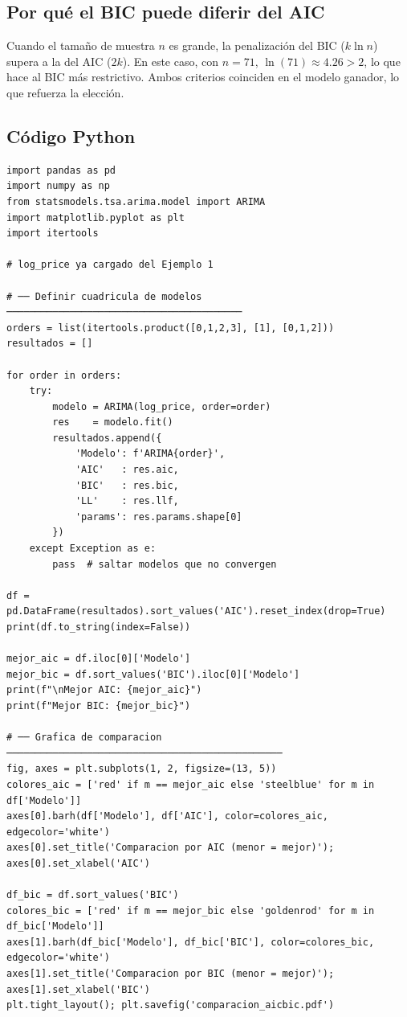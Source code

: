 \documentclass[12pt,a4paper]{article}
\begin{document}
\subsection{Por qu\'{e} el BIC puede diferir del AIC}

Cuando el tama\~no de muestra $n$ es grande, la penalizaci\'{o}n del BIC
($k\ln n$) supera a la del AIC ($2k$). En este caso, con $n=71$,
$\ln(71)\approx 4.26 > 2$, lo que hace al BIC m\'{a}s restrictivo. Ambos
criterios coinciden en el modelo ganador, lo que refuerza la elecci\'{o}n.

\subsection{C\'{o}digo Python}

\begin{lstlisting}[caption={Ejemplo 2 --- Comparaci\'{o}n de modelos con AIC y BIC},
                   label={lst:ej2}]
import pandas as pd
import numpy as np
from statsmodels.tsa.arima.model import ARIMA
import matplotlib.pyplot as plt
import itertools

# log_price ya cargado del Ejemplo 1

# ── Definir cuadricula de modelos ─────────────────────────────────────────
orders = list(itertools.product([0,1,2,3], [1], [0,1,2]))
resultados = []

for order in orders:
    try:
        modelo = ARIMA(log_price, order=order)
        res    = modelo.fit()
        resultados.append({
            'Modelo': f'ARIMA{order}',
            'AIC'   : res.aic,
            'BIC'   : res.bic,
            'LL'    : res.llf,
            'params': res.params.shape[0]
        })
    except Exception as e:
        pass  # saltar modelos que no convergen

df = pd.DataFrame(resultados).sort_values('AIC').reset_index(drop=True)
print(df.to_string(index=False))

mejor_aic = df.iloc[0]['Modelo']
mejor_bic = df.sort_values('BIC').iloc[0]['Modelo']
print(f"\nMejor AIC: {mejor_aic}")
print(f"Mejor BIC: {mejor_bic}")

# ── Grafica de comparacion ────────────────────────────────────────────────
fig, axes = plt.subplots(1, 2, figsize=(13, 5))
colores_aic = ['red' if m == mejor_aic else 'steelblue' for m in df['Modelo']]
axes[0].barh(df['Modelo'], df['AIC'], color=colores_aic, edgecolor='white')
axes[0].set_title('Comparacion por AIC (menor = mejor)'); axes[0].set_xlabel('AIC')

df_bic = df.sort_values('BIC')
colores_bic = ['red' if m == mejor_bic else 'goldenrod' for m in df_bic['Modelo']]
axes[1].barh(df_bic['Modelo'], df_bic['BIC'], color=colores_bic, edgecolor='white')
axes[1].set_title('Comparacion por BIC (menor = mejor)'); axes[1].set_xlabel('BIC')
plt.tight_layout(); plt.savefig('comparacion_aicbic.pdf')
\end{lstlisting}
\end{document}
